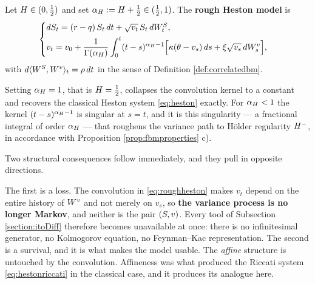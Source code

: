 \begin{definition}\label{def:roughheston}
Let $H\in(0,\tfrac12)$ and set $\alpha_{H} := H + \tfrac12 \in (\tfrac12,1)$. The
\textbf{rough Heston model} is
\begin{equation}\label{eq:roughheston}
\begin{cases}
d S_t = (r-q)\,S_t\,d t + \sqrt{v_t}\,S_t\,d W^{S}_t, \\[4pt]
\displaystyle v_t = v_0 + \frac{1}{\Gamma(\alpha_H)}\int_0^t (t-s)^{\alpha_H-1}
\Bigl[ \kappa(\theta - v_s)\,d s + \xi\sqrt{v_s}\,d W^{v}_s \Bigr],
\end{cases}
\end{equation}
with $d\langle W^{S},W^{v}\rangle_t = \rho\,d t$ in the sense of Definition
\ref{def:correlatedbm}.
\end{definition}

Setting $\alpha_H = 1$, that is $H = \tfrac12$, collapses the convolution kernel to a
constant and recovers the classical Heston system \eqref{eq:heston} exactly. For
$\alpha_H<1$ the kernel $(t-s)^{\alpha_H-1}$ is singular at $s=t$, and it is this
singularity --- a fractional integral of order $\alpha_H$ --- that roughens the variance
path to Hölder regularity $H^{-}$, in accordance with Proposition \ref{prop:fbmproperties} c).

Two structural consequences follow immediately, and they pull in opposite directions.

The first is a loss. The convolution in \eqref{eq:roughheston} makes $v_t$ depend on the entire
history of $W^v$ and not merely on $v_s$, so \textbf{the variance process is no longer Markov},
and neither is the pair $(S,v)$. Every tool of Subsection \ref{section:itoDiff} therefore
becomes unavailable at once: there is no infinitesimal generator, no Kolmogorov equation, no
Feynman--Kac representation. The second is a survival, and it is what makes the model usable. The \emph{affine} structure is untouched by
the convolution. Affineness was what produced the Riccati system \eqref{eq:hestonriccati} in the
classical case, and it produces its analogue here.

